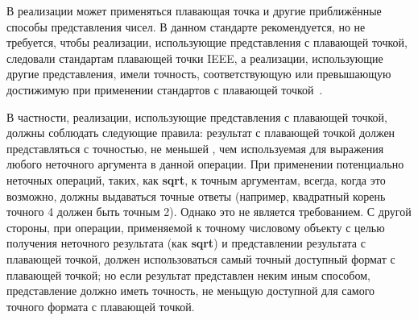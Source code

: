 В реализации может применяться плавающая точка и другие приближённые способы представления
 чисел. В данном стандарте рекомендуется, но не требуется, чтобы реализации,
использующие представления с плавающей точкой, следовали стандартам плавающей точки IEEE, а
реализации, использующие другие представления, имели точность, соответствующую или превышающую
достижимую при применении стандартов с плавающей точкой~\cite{IEEE}.

В частности, реализации, использующие представления с плавающей точкой, должны соблюдать
следующие правила: результат с плавающей точкой должен представляться с точностью, не меньшей ,
чем используемая для выражения любого неточного аргумента в данной операции. При применении
потенциально неточных операций, таких, как {\cf\bfseries sqrt}, к точным аргументам, всегда,
когда это возможно, должны выдаваться точные ответы (например, квадратный корень точного 4
должен быть точным 2). Однако это не является требованием. С другой стороны, при операции,
применяемой к точному числовому объекту с целью получения неточного результата (как
{\cf\bfseries sqrt}) и представлении результата с плавающей точкой, должен использоваться самый
точный доступный формат с плавающей точкой; но если результат представлен неким иным способом,
представление должно иметь точность, не меньщую доступной для самого точного формата с
плавающей точкой.

